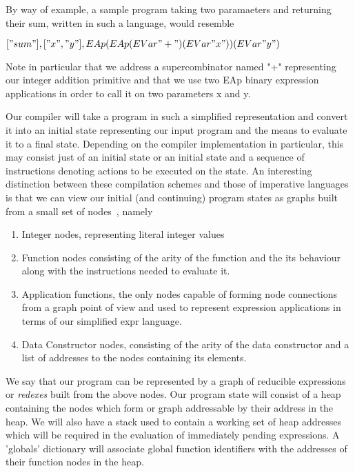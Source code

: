 \noindent By way of example, a sample program taking two paramaeters and returning
their sum, written in such a language, would resemble

\begin{center} \( ["sum"], ["x", "y"], EAp (EAp (EVar "+") (EVar "x")) (EVar "y") \) \end{center}

\noindent Note in particular that we address a supercombinator named "+" 
representing our integer addition primitive and that we use two EAp 
binary expression applications in order to call it on two parameters x and y.

Our compiler will take a program in such a simplified representation
and convert it into an initial state representing our input program and the
means to evaluate it to a final state. Depending on the compiler implementation
in particular, this may consist just of an initial state or an initial state
and a sequence of instructions denoting actions to be executed on the state. 
An interesting 
distinction between these compilation schemes and those of imperative languages
is that we can view our initial (and continuing) program states as graphs built
from a small set of nodes~\cite[pp.185]{SPJ}, namely

\begin{enumerate}
	\item Integer nodes, representing literal integer values
	\item Function nodes consisting of the arity of the function and the
		  its behaviour along with the instructions needed to evaluate it.
	\item Application functions, the only nodes capable of forming 
		  node connections from a graph point of view and used to represent
		  expression applications in terms of our simplified expr language.
	\item Data Constructor nodes, consisting of the arity of the data
		  constructor and a list of addresses to the nodes containing its
		  elements.
\end{enumerate}

We say that our program can be represented by a graph of reducible expressions
or \emph{redexes} built from the above nodes. 
Our program state will consist of a heap containing the nodes which form
or graph addressable by their address in the heap. We will
also have a stack used to contain a working set of heap addresses which 
will be required in the evaluation of immediately pending expressions. A 
'globals' dictionary will associate global function identifiers with the
addresses of their function nodes in the heap. \\

